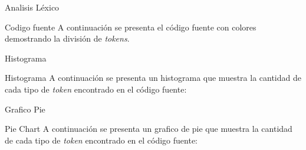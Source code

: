 \documentclass[10pt,xcolor={dvipsnames}]{beamer}
\begin{document}
\begin{frame}{Analisis Léxico}
        \begin{alertblock}{Codigo fuente}
            A continuación se presenta el código fuente con colores demostrando la división de \textit{tokens}.
            \end{alertblock}
\end{frame}


\begin{frame}{Histograma}
        \begin{alertblock}{Histograma}
            A continuación se presenta un histograma que muestra la cantidad de cada tipo de \textit{token} encontrado en el código fuente:
            \end{alertblock}
\end{frame}


\begin{frame}{Grafico Pie}
        \begin{alertblock}{Pie Chart}
            A continuación se presenta un grafico de pie que muestra la cantidad de cada tipo de \textit{token} encontrado en el código fuente:
            \end{alertblock}
\end{frame}

\end{document}
